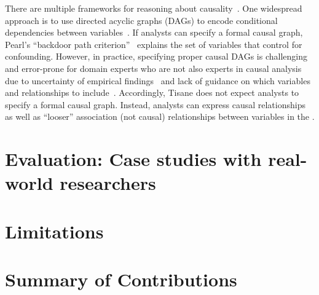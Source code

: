 There are multiple frameworks for
reasoning about causality~\cite{rubin2004teaching,pearl1995causal}. One
widespread approach is to use directed acyclic graphs (DAGs) to encode
conditional dependencies between
variables~\cite{pearl1995doCalculus,greenland1999causal,spirtes1994conditional,spirtes1996using}.
If analysts can specify a formal causal graph, Pearl's ``backdoor path
criterion''~\cite{pearl1995causal,pearl2000models} explains the set of variables
that control for confounding. However, in practice, specifying proper causal
DAGs is challenging and error-prone for domain experts who are not also experts
in causal analysis~\cite{suzuki2020causal} due to uncertainty of empirical
findings~\cite{suzuki2018mechanisms} and lack of guidance on which variables and
relationships to include~\cite{velentgas2013developing}. Accordingly, Tisane
does not expect analysts to specify a formal causal graph. Instead, analysts can
express causal relationships as well as ``looser'' association (not causal)
relationships between variables in the \SDSLlong.






\section{Evaluation: Case studies with real-world researchers}


\section{Limitations}
\section{Summary of Contributions}